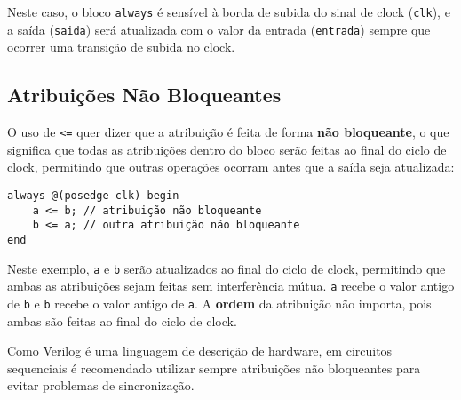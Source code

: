 \documentclass{article}
\begin{document}
Neste caso, o bloco \texttt{always} é sensível à borda de subida do sinal de clock (\texttt{clk}), e a saída (\texttt{saida}) será atualizada com o valor da entrada (\texttt{entrada}) sempre que ocorrer uma transição de subida no clock.

\subsection*{Atribuições Não Bloqueantes}

O uso de \texttt{<=} quer dizer que a atribuição é feita de forma \textbf{não bloqueante}, o que significa que todas as atribuições dentro do bloco serão feitas ao final do ciclo de clock, permitindo que outras operações ocorram antes que a saída seja atualizada:

\begin{lstlisting}
always @(posedge clk) begin
    a <= b; // atribuição não bloqueante
    b <= a; // outra atribuição não bloqueante
end
\end{lstlisting}

Neste exemplo, \texttt{a} e \texttt{b} serão atualizados ao final do ciclo de clock, permitindo que ambas as atribuições sejam feitas sem interferência mútua. \texttt{a} recebe o valor antigo de \texttt{b} e \texttt{b} recebe o valor antigo de \texttt{a}. A \textbf{ordem} da atribuição não importa, pois ambas são feitas ao final do ciclo de clock.

Como Verilog é uma linguagem de descrição de hardware, em circuitos sequenciais é recomendado utilizar sempre atribuições não bloqueantes para evitar problemas de sincronização.
\end{document}
